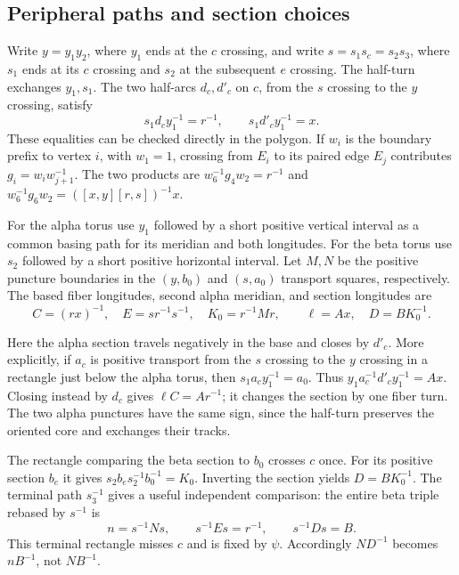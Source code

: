 \documentclass[11pt]{amsart}
\theoremstyle{definition}
\theoremstyle{remark}
\begin{document}
\subsection{Peripheral paths and section choices}\label{subsec:paths}
Write $y=y_1y_2$, where $y_1$ ends at the $c$ crossing, and write
$s=s_1s_c=s_2s_3$, where $s_1$ ends at its $c$ crossing and $s_2$
at the subsequent $e$ crossing. The half-turn exchanges $y_1,s_1$.
The two half-arcs $d_c,d'_c$ on $c$, from the $s$ crossing to the
$y$ crossing, satisfy
\begin{equation}\label{eq:arcs}
          s_1d_cy_1^{-1}=r^{-1},\qquad
          s_1d'_cy_1^{-1}=x.
\end{equation}
These equalities can be checked directly in the polygon. If $w_i$
is the boundary prefix to vertex $i$, with $w_1=1$, crossing from
$E_i$ to its paired edge $E_j$ contributes $g_i=w_iw_{j+1}^{-1}$.
The two products are $w_6^{-1}g_4w_2=r^{-1}$ and
$w_6^{-1}g_6w_2=([x,y][r,s])^{-1}x$.

For the alpha torus use $y_1$ followed by a short positive vertical
interval as a common basing path for its meridian and both longitudes.
For the beta torus use $s_2$ followed by a short positive horizontal
interval. Let $M,N$ be the positive puncture boundaries in the
$(y,b_0)$ and $(s,a_0)$ transport squares, respectively. The based
fiber longitudes, second alpha meridian, and section longitudes are
\begin{equation}\label{eq:peripheral}
 C=(rx)^{-1},\quad E=sr^{-1}s^{-1},\quad K_0=r^{-1}Mr,
 \qquad \ell=Ax,\quad D=BK_0^{-1}.
\end{equation}

Here the alpha section travels negatively in the base and closes by
$d'_c$. More explicitly, if $a_c$ is positive transport from the
$s$ crossing to the $y$ crossing in a rectangle just below the alpha
torus, then $s_1a_cy_1^{-1}=a_0$. Thus
$y_1a_c^{-1}d'_cy_1^{-1}=Ax$. Closing instead by $d_c$ gives
$\ell C=Ar^{-1}$; it changes the section by one fiber turn.
The two alpha punctures have the same sign, since the half-turn
preserves the oriented core and exchanges their tracks.

The rectangle comparing the beta section to $b_0$ crosses $c$ once.
For its positive section $b_e$ it gives
$s_2b_es_2^{-1}b_0^{-1}=K_0$. Inverting the section yields
$D=BK_0^{-1}$. The terminal path $s_3^{-1}$ gives a useful independent
comparison: the entire beta triple rebased by $s^{-1}$ is
\begin{equation}\label{eq:beta-rebase}
       n=s^{-1}Ns,\qquad s^{-1}Es=r^{-1},\qquad s^{-1}Ds=B.
\end{equation}
This terminal rectangle misses $c$ and is fixed by $\psi$.
Accordingly $ND^{-1}$ becomes $nB^{-1}$, not $NB^{-1}$.
\end{document}
